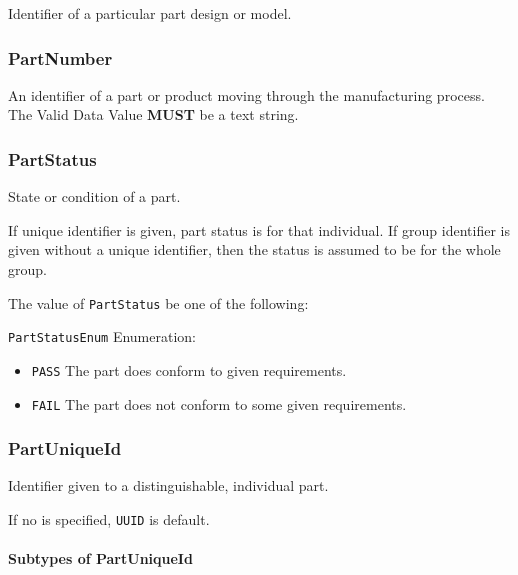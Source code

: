 Identifier of a particular part design or model.


\subsubsection{PartNumber}
\label{sec:PartNumber}



An identifier of a part or product moving through the manufacturing process. 
 The \gls{Valid Data Value} \textbf{MUST} be a text string. 


\subsubsection{PartStatus}
\label{sec:PartStatus}



State or condition of a part.

If unique identifier is given, part status is for that individual. If group identifier is given without a unique identifier, then the status is assumed to be for the whole group.


The value of \texttt{PartStatus} \MUST be one of the following: 


\texttt{PartStatusEnum} Enumeration:

\begin{itemize}
\item \texttt{PASS} \newline The part does conform to given requirements. 
\item \texttt{FAIL} \newline The part does not conform to some given requirements. 
\end{itemize}

\FloatBarrier

\subsubsection{PartUniqueId}
\label{sec:PartUniqueId}



Identifier given to a distinguishable, individual part. 

If no  is specified, \texttt{UUID} is default.



\paragraph{Subtypes of PartUniqueId}\mbox{}
\label{sec:Subtypes of PartUniqueId}

